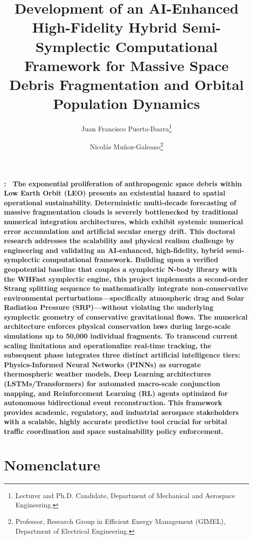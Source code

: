 \documentclass[11pt,letterpaper]{article}
\title{\textbf{Development of an AI-Enhanced High-Fidelity Hybrid Semi-Symplectic Computational Framework for Massive Space Debris Fragmentation and Orbital Population Dynamics}}
\author{Juan Francisco Puerta-Ibarra\thanks{Lecturer and Ph.D. Candidate, Department of Mechanical and Aerospace Engineering.}}
\author{Nicolás Muñoz-Galeano\thanks{Professor, Research Group in Efficient Energy Management (GIMEL), Department of Electrical Engineering.}}
\affil{Universidad de Antioquia, Medellín, Antioquia, 050010, Colombia}
\date{}
\renewenvironment{abstract}
 {\small\quotation\bfseries\noindent\abstractname:\ }
 {\endquotation}
\begin{document}
\maketitle

\begin{abstract}
The exponential proliferation of anthropogenic space debris within Low Earth Orbit (LEO) presents an existential hazard to spatial operational sustainability. Deterministic multi-decade forecasting of massive fragmentation clouds is severely bottlenecked by traditional numerical integration architectures, which exhibit systemic numerical error accumulation and artificial secular energy drift. This doctoral research addresses the scalability and physical realism challenge by engineering and validating an AI-enhanced, high-fidelity, hybrid semi-symplectic computational framework. Building upon a verified geopotential baseline that couples a symplectic N-body library with the WHFast symplectic engine, this project implements a second-order Strang splitting sequence to mathematically integrate non-conservative environmental perturbations---specifically atmospheric drag and Solar Radiation Pressure (SRP)---without violating the underlying symplectic geometry of conservative gravitational flows. The numerical architecture enforces physical conservation laws during large-scale simulations up to 50,000 individual fragments. To transcend current scaling limitations and operationalize real-time tracking, the subsequent phase integrates three distinct artificial intelligence tiers: Physics-Informed Neural Networks (PINNs) as surrogate thermospheric weather models, Deep Learning architectures (LSTMs/Transformers) for automated macro-scale conjunction mapping, and Reinforcement Learning (RL) agents optimized for autonomous bidirectional event reconstruction. This framework provides academic, regulatory, and industrial aerospace stakeholders with a scalable, highly accurate predictive tool crucial for orbital traffic coordination and space sustainability policy enforcement.
\end{abstract}

\section*{Nomenclature}
\end{document}
